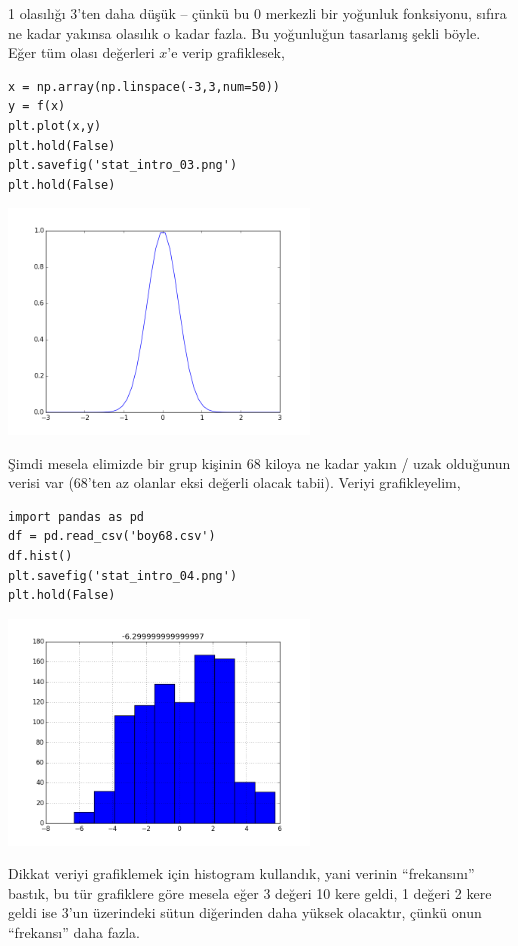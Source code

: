 \documentclass[12pt,fleqn]{article}\usepackage{../../common}
\begin{document}
1 olasılığı 3'ten daha düşük -- çünkü bu 0 merkezli bir yoğunluk
fonksiyonu, sıfıra ne kadar yakınsa olasılık o kadar fazla. Bu yoğunluğun
tasarlanış şekli böyle. Eğer tüm olası değerleri $x$'e verip grafiklesek,

\begin{verbatim}
x = np.array(np.linspace(-3,3,num=50))
y = f(x)
plt.plot(x,y)
plt.hold(False)
plt.savefig('stat_intro_03.png')
plt.hold(False)
\end{verbatim}

\includegraphics[height=6cm]{stat_intro_03.png}

Şimdi mesela elimizde bir grup kişinin 68 kiloya ne kadar yakın / uzak
olduğunun verisi var (68'ten az olanlar eksi değerli olacak tabii). Veriyi
grafikleyelim,

\begin{verbatim}
import pandas as pd
df = pd.read_csv('boy68.csv')
df.hist()
plt.savefig('stat_intro_04.png')
plt.hold(False)
\end{verbatim}

\includegraphics[height=6cm]{stat_intro_04.png}

Dikkat veriyi grafiklemek için histogram kullandık, yani verinin
``frekansını'' bastık, bu tür grafiklere göre mesela eğer 3 değeri 10 kere
geldi, 1 değeri 2 kere geldi ise 3'un üzerindeki sütun diğerinden daha
yüksek olacaktır, çünkü onun ``frekansı'' daha fazla.  
\end{document}
